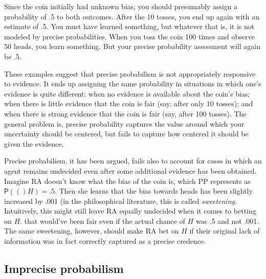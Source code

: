 \documentclass[
  10pt,
  dvipsnames,enabledeprecatedfontcommands]{scrartcl}
\newcommand{\pr}[1]{\mathsf{P}(#1)}
\begin{document}
\noindent Since the coin initially had unknown bias, you should
presumably assign a probability of .5 to both outcomes. After the 10
tosses, you end up again with an estimate of .5. You must have learned
something, but whatever that is, it is not modeled by precise
probabilities. When you toss the coin 100 times and observe 50 heads,
you learn something. But your precise probability assessment will again
be .5.

These examples suggest that precise probabilism is not appropriately
responsive to evidence. It ends up assigning the same probability in
situations in which one's evidence is quite different: when no evidence
is available about the coin's bias; when there is little evidence that
the coin is fair (say, after only 10 tosses); and when there is strong
evidence that the coin is fair (say, after 100 tosses). The general
problem is, precise probability captures the value around which your
uncertainty should be centered, but fails to capture how centered it
should be given the evidence.

Precise probabilism, it has been argued, fails also to account for cases
in which an agent remains undecided even after some additional evidence
has been obtained. Imagine RA doesn't know what the bias of the coin is,
which PP represents as \(\pr(H)= .5\). Then she learns that the bias
towards heads has been slightly increased by .001 (in the philosophical
literature, this is called \emph{sweetening}. Intuitively, this might
still leave RA equally undecided when it comes to betting on \(H\). that
would've been fair even if the actual chance of \(H\) was .5 and not
.001. The same sweetening, however, should make RA bet on \(H\) if their
original lack of information was in fact correctly captured as a precise
credence.

\hypertarget{imprecise-probabilism}{%
\subsection{Imprecise probabilism}\label{imprecise-probabilism}}
\end{document}
